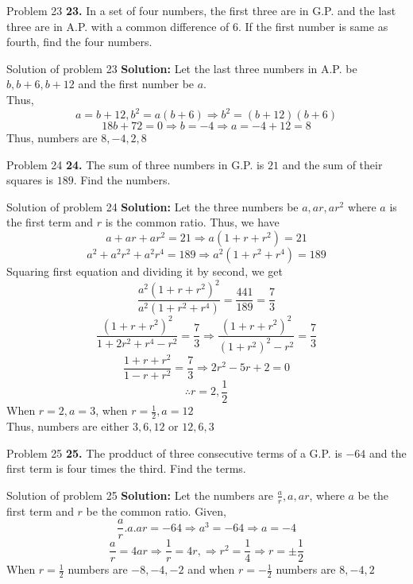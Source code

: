 \documentclass[aspectratio=1610,8pt]{beamer}
\begin{document}
\begin{frame}{Problem 23}
  \textbf{23.} In a set of four numbers, the first three are in G.P. and the
  last three are in A.P. with a common difference of $6$. If the first number
  is same as fourth, find the four numbers.
\end{frame}
\begin{frame}{Solution of problem 23}
  \textbf{Solution:} Let the last three numbers in A.P. be $b, b+6, b+12$ and
  the first number be $a$.\\
  Thus, $$a = b + 12, b^2 = a(b + 6) \Rightarrow b^2 = (b + 12)(b + 6)$$
  $$18b + 72 = 0 \Rightarrow b = -4 \Rightarrow a = -4 + 12 = 8$$
  Thus, numbers are $8, -4, 2, 8$
\end{frame}
\begin{frame}{Problem 24}
  \textbf{24.} The sum of three numbers in G.P. is $21$ and the sum of their
  squares is $189$. Find the numbers.
\end{frame}
\begin{frame}{Solution of problem 24}
  \textbf{Solution:} Let the three numbers be $a, ar, ar^2$ where $a$ is the
  first term and $r$ is the common ratio. Thus, we have
  $$a + ar + ar^2 = 21 \Rightarrow a(1 + r + r^2) = 21$$
  $$a^2 + a^2r^2 + a^2r^4 = 189 \Rightarrow a^2(1 + r^2 + r^4) = 189$$
  Squaring first equation and dividing it by second, we get
  $$\frac{a^2(1 + r + r^2)^2}{a^2(1 + r^2 + r^4)} = \frac{441}{189} =
  \frac{7}{3}$$
  $$\frac{(1 + r + r^2)^2}{1 + 2r^2 + r^4 - r^2} = \frac{7}{3} \Rightarrow
  \frac{(1 + r + r^2)^2}{(1 + r^2)^2 - r^2} = \frac{7}{3}$$
  $$\frac{1 + r + r^2}{1 -r + r^2} = \frac{7}{3} \Rightarrow 2r^2 - 5r + 2 =
  0$$
  $$\therefore r = 2, \frac{1}{2}$$
  When $r = 2, a = 3$, when $r = \frac{1}{2}, a = 12$\\
  Thus, numbers are either $3, 6, 12$ or $12, 6, 3$  
\end{frame}
\begin{frame}{Problem 25}
  \textbf{25.} The prodduct of three consecutive terms of a G.P. is $-64$ and
  the first term is four times the third. Find the terms.
\end{frame}
\begin{frame}{Solution of problem 25}
  \textbf{Solution:} Let the numbers are $\frac{a}{r}, a, ar$, where $a$ be the
  first term and $r$ be the common ratio. Given,
  $$\frac{a}{r}.a.ar = -64 \Rightarrow a^3 = -64 \Rightarrow a = -4$$
  $$\frac{a}{r} = 4ar \Rightarrow \frac{1}{r} = 4r, \Rightarrow r^2 =
  \frac{1}{4} \Rightarrow r = \pm \frac{1}{2}$$
  When $r = \frac{1}{2}$ numbers are $-8, -4, -2$ and when $r = -\frac{1}{2}$
  numbers are $8, -4, 2$
\end{frame}
\end{document}
